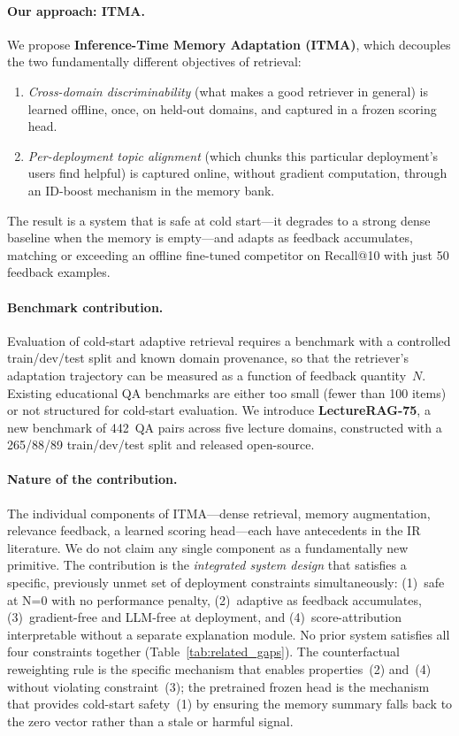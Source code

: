 \documentclass[preprint,12pt]{elsarticle}
\begin{document}
\paragraph{Our approach: ITMA.}
We propose \textbf{Inference-Time Memory Adaptation (ITMA)}, which decouples
the two fundamentally different objectives of retrieval:
\begin{enumerate}
  \item \emph{Cross-domain discriminability} (what makes a good retriever in
        general) is learned offline, once, on held-out domains, and captured
        in a frozen scoring head.
  \item \emph{Per-deployment topic alignment} (which chunks this particular
        deployment's users find helpful) is captured online, without gradient
        computation, through an ID-boost mechanism in the memory bank.
\end{enumerate}
The result is a system that is safe at cold start---it degrades to a strong
dense baseline when the memory is empty---and adapts as feedback
accumulates, matching or exceeding an offline fine-tuned competitor on
Recall@10 with just 50 feedback examples.

\paragraph{Benchmark contribution.}
Evaluation of cold-start adaptive retrieval requires a benchmark with a
controlled train/dev/test split and known domain provenance, so that the
retriever's adaptation trajectory can be measured as a function of
feedback quantity~$N$.  Existing educational QA benchmarks are either too small
(fewer than 100 items) or not structured for cold-start evaluation.  We
introduce \textbf{LectureRAG-75}, a new benchmark of 442~QA pairs across five
lecture domains, constructed with a 265/88/89 train/dev/test split and released
open-source.

\paragraph{Nature of the contribution.}
The individual components of ITMA---dense retrieval, memory augmentation,
relevance feedback, a learned scoring head---each have antecedents in the IR
literature.  We do not claim any single component as a fundamentally new
primitive.  The contribution is the \emph{integrated system design} that
satisfies a specific, previously unmet set of deployment constraints
simultaneously: (1)~safe at N=0 with no performance penalty, (2)~adaptive
as feedback accumulates, (3)~gradient-free and LLM-free at deployment,
and (4)~score-attribution interpretable without a separate explanation module.
No prior system satisfies all four constraints together
(Table~\ref{tab:related_gaps}).  The counterfactual reweighting rule is the
specific mechanism that enables properties~(2) and~(4) without violating
constraint~(3); the pretrained frozen head is the mechanism that provides
cold-start safety~(1) by ensuring the memory summary falls back to the zero
vector rather than a stale or harmful signal.
\end{document}
